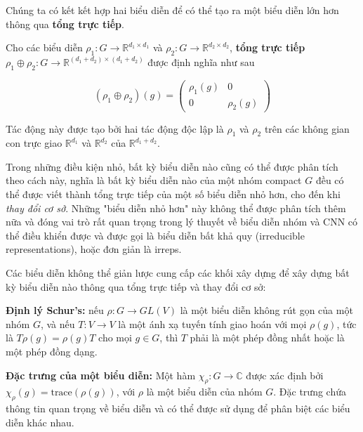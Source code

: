 Chúng ta có kết kết hợp hai biểu diễn để có thể tạo ra một biểu diễn lớn hơn thông qua \textbf{tổng trực tiếp}.

Cho các biểu diễn $\rho_1 : G \to \mathbb{R}^{d_1 \times d_1}$ và $\rho_2 : G \to \mathbb{R}^{d_2 \times d_2}$, \textbf{tổng trực tiếp} $\rho_1 \oplus \rho_2: G \to \mathbb{R}^{(d_1 + d_2) \times (d_1 + d_2)}$ được định nghĩa như sau 

$$
    (\rho_1 \oplus \rho_2)(g) = \begin{pmatrix}\rho_1(g) & 0 \\ 0 & \rho_2(g) \end{pmatrix} 
$$

Tác động này được tạo bởi hai tác động độc lập là $\rho_1$ và $\rho_2$ trên các không gian con trực giao $\mathbb{R}^{d_1}$ và  $\mathbb{R}^{d_2}$  của $\mathbb{R}^{d_1 + d_2}$.


Trong những điều kiện nhỏ, bất kỳ biểu diễn nào cũng có thể được phân tích theo cách này, nghĩa là bất kỳ biểu diễn nào của một nhóm compact $G$ đều có thể được viết thành tổng trực tiếp của một số biểu diễn nhỏ hơn, cho đến khi \textit{thay đổi cơ sở}. Những "biểu diễn nhỏ hơn" này không thể được phân tích thêm nữa và đóng vai trò rất quan trọng trong lý thuyết về biểu diễn nhóm và CNN có thể điều khiển được và được gọi là biểu diễn bất khả quy (irreducible representations), hoặc đơn giản là irreps.

Các biểu diễn không thể giản lược cung cấp các khối xây dựng để xây dựng bất kỳ biểu diễn nào thông qua tổng trực tiếp và thay đổi cơ sở:

\begin{center}
\end{center}


\textbf{Định lý Schur's:} nếu $\rho: G \rightarrow GL(V)$ là một biểu diễn không rút gọn của một nhóm $G$, và nếu $T: V \rightarrow V$ là một ánh xạ tuyến tính giao hoán với mọi $\rho(g)$, tức là $T \rho(g) = \rho(g) T$ cho mọi $g \in G$, thì $T$ phải là một phép đồng nhất hoặc là một phép đồng dạng.

\textbf{Đặc trưng của một biểu diễn:} Một hàm $\chi_\rho: G \rightarrow \mathbb{C}$ được xác định bởi $\chi_\rho(g) = \text{trace}(\rho(g))$, với $\rho$ là một biểu diễn của nhóm $G$. Đặc trưng chứa thông tin quan trọng về biểu diễn và có thể được sử dụng để phân biệt các biểu diễn khác nhau.
